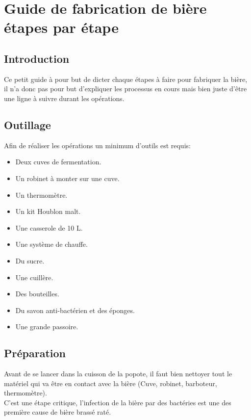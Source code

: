 \documentclass[twoside,twocolumn]{report}
\author{%
\textsc{Samuel Dupont}\\ %
\normalsize \href{mailto:Samuel.dupont.etu@univ-lemans.fr}{Samuel.dupont.etu@univ-lemans.fr } 
}
\date{Février 10, 2017 \\ Last update: \today}
\begin{document}
\maketitle
			 
		\chapter{Guide de fabrication de bière étapes par étape}
		\section{Introduction}
		Ce petit guide à pour but de dicter chaque étapes à faire pour fabriquer la bière, il n'a donc pas pour but d'expliquer les processus en cours mais bien juste d'être une ligne à suivre durant les opérations.
		
		\section{Outillage}
		Afin de réaliser les opérations un minimum d'outils est requis: 
		\begin{itemize}
			\item Deux cuves de fermentation.
			\item Un robinet à monter sur une cuve.
			\item Un thermomètre.
			\item Un kit Houblon malt.
			\item Une casserole de 10 L.
			\item Une système de chauffe.
			\item Du sucre.
			\item Une cuillère.
			\item Des bouteilles.	
			\item Du savon anti-bactérien et des éponges.
			\item Une  grande passoire.	 
		\end{itemize}
		
		\section{Préparation}
		Avant de se lancer dans la cuisson de la popote, il faut bien nettoyer tout le matériel qui va être en contact avec la bière (Cuve, robinet, barboteur, thermomètre).\\
		C'est une étape critique, l'infection de la bière par des bactéries est une des première cause de bière brassé raté.
		
\end{document}
